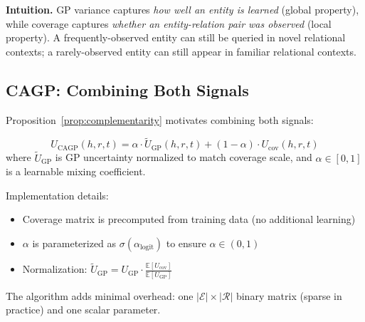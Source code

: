 \noindent\textbf{Intuition.} GP variance captures \emph{how well an entity is learned} (global property), while coverage captures \emph{whether an entity-relation pair was observed} (local property). A frequently-observed entity can still be queried in novel relational contexts; a rarely-observed entity can still appear in familiar relational contexts.

\subsection{CAGP: Combining Both Signals}

Proposition~\ref{prop:complementarity} motivates combining both signals:

\begin{definition}
\begin{equation}
    U_{\text{CAGP}}(h, r, t) = \alpha \cdot \tilde{U}_{\text{GP}}(h, r, t) + (1-\alpha) \cdot U_{\text{cov}}(h, r, t)
\end{equation}
where $\tilde{U}_{\text{GP}}$ is GP uncertainty normalized to match coverage scale, and $\alpha \in [0,1]$ is a learnable mixing coefficient.
\end{definition}

Implementation details:
\begin{itemize}
    \item Coverage matrix is precomputed from training data (no additional learning)
    \item $\alpha$ is parameterized as $\sigma(\alpha_{\text{logit}})$ to ensure $\alpha \in (0,1)$
    \item Normalization: $\tilde{U}_{\text{GP}} = U_{\text{GP}} \cdot \frac{\mathbb{E}[U_{\text{cov}}]}{\mathbb{E}[U_{\text{GP}}]}$
\end{itemize}

The algorithm adds minimal overhead: one $|\mathcal{E}| \times |\mathcal{R}|$ binary matrix (sparse in practice) and one scalar parameter.
